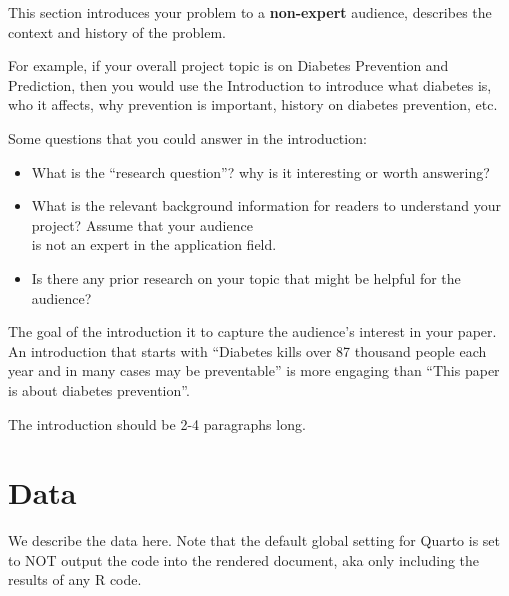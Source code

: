 \documentclass[
  letterpaper,
  DIV=11,
  numbers=noendperiod]{scrreprt}
\begin{document}
\begin{tcolorbox}[enhanced jigsaw, bottomrule=.15mm, left=2mm, bottomtitle=1mm, leftrule=.75mm, coltitle=black, toprule=.15mm, breakable, opacitybacktitle=0.6, titlerule=0mm, colback=white, colbacktitle=quarto-callout-note-color!10!white, toptitle=1mm, arc=.35mm, rightrule=.15mm, colframe=quarto-callout-note-color-frame, opacityback=0, title=\textcolor{quarto-callout-note-color}{\faInfo}\hspace{0.5em}{From the report requirements}]

This section introduces your problem to a \textbf{non-expert} audience,
describes the context and history of the problem.

For example, if your overall project topic is on Diabetes Prevention and
Prediction, then you would use the Introduction to introduce what
diabetes is, who it affects, why prevention is important, history on
diabetes prevention, etc.

Some questions that you could answer in the introduction:

\begin{itemize}
\item
  What is the ``research question''? why is it interesting or worth
  answering?
\item
  What is the relevant background information for readers to understand
  your project? Assume that your audience\\
  is not an expert in the application field.
\item
  Is there any prior research on your topic that might be helpful for
  the audience?
\end{itemize}

The goal of the introduction it to capture the audience's interest in
your paper. An introduction that starts with ``Diabetes kills over 87
thousand people each year and in many cases may be preventable'' is more
engaging than ``This paper is about diabetes prevention''.

The introduction should be 2-4 paragraphs long.

\end{tcolorbox}


\hypertarget{data}{%
\chapter{Data}\label{data}}

We describe the data here. Note that the default global setting for
Quarto is set to NOT output the code into the rendered document, aka
only including the results of any R code.
\end{document}
